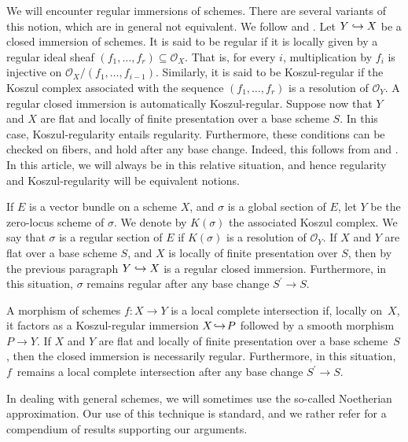 \documentclass[11pt]{article}
\newcommand\hto{\mathrel{\lhook\joinrel\to}}
\theoremstyle{plain}
\theoremstyle{definition}
\newcommand{\Ocal}{\mathcal O}
\begin{document}
We will encounter regular immersions of schemes. There are several variants of this notion, which are in general not equivalent. We follow \cite[\href{https://stacks.math.columbia.edu/tag/0638}{0638}]{stacks-project} and \cite[\href{https://stacks.math.columbia.edu/tag/067M}{067M}]{stacks-project}. Let $Y\hto X$ be a closed immersion of schemes. It is said to be regular if it is locally given by a regular ideal sheaf $(f_{1},\ldots, f_{r})\subseteq\Ocal_{X}$. That is, for every $i$, multiplication by $f_{i}$ is injective on $\Ocal_{X}/(f_{1},\ldots, f_{i-1})$. Similarly, it is said to be Koszul-regular if the Koszul complex associated with the sequence $(f_{1},\ldots, f_{r})$ is a resolution of $\Ocal_{Y}$. A regular closed immersion is automatically Koszul-regular. Suppose now that $Y$ and $X$ are flat and locally of finite presentation over a base scheme $S$. In this case, Koszul-regularity entails regularity. Furthermore, these conditions can be checked on fibers, and hold after any base change. Indeed, this follows from \cite[\href{https://stacks.math.columbia.edu/tag/063K}{063K}]{stacks-project} and \cite[Prop.\,19.2.4]{EGAIV4}. In this article, we will always be in this relative situation, and hence regularity and Koszul-regularity will be equivalent notions.

If $E$ is a vector bundle on a scheme $X$, and $\sigma$ is a global section of $E$, let $Y$ be the zero-locus scheme of $\sigma$. We denote by $K(\sigma)$ the associated Koszul complex. We say that $\sigma$ is a regular section of $E$ if $K(\sigma)$ is a resolution of $\Ocal_{Y}$. If $X$ and $Y$ are flat over a base scheme $S$, and $X$ is locally of finite presentation over $S$, then by the previous paragraph $Y\hto X$ is a regular closed immersion. Furthermore, in this situation, $\sigma$ remains regular after any base change $S^{\prime}\to S$.\enlargethispage{-2\baselineskip}%

A morphism of schemes $f\colon X\to Y$ is a local complete intersection if, locally on~$X$, it factors as a Koszul-regular immersion $X\!\hto\! P$ followed by a smooth morphism $P\!\to\! Y$. If $X$ and $Y$ are flat and locally of finite presentation over a base scheme~$S$, then the closed immersion is necessarily regular. Furthermore, in this situation, $f$~remains a local complete intersection after any base change $S^{\prime}\to S$.

In dealing with general schemes, we will sometimes use the so-called Noetherian approximation. Our use of this technique is standard, and we rather refer \cite[\href{https://stacks.math.columbia.edu/tag/01YT}{01YT}]{stacks-project} for a compendium of results supporting our arguments.
\end{document}
